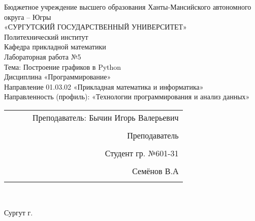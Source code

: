 \documentclass[a4paper]{article}
\begin{document}
\thispagestyle{empty}
\begin{center}

\large{Бюджетное учреждение высшего образования Ханты-Мансийского автономного округа – Югры}\\
\large{«СУРГУТСКИЙ ГОСУДАРСТВЕННЫЙ УНИВЕРСИТЕТ»}\\

\hfill \break
\normalsize{Политехнический институт}\\
 \hfill \break
\normalsize{Кафедра прикладной математики}\\
\hfill\break
\hfill \break
\hfill \break
\hfill \break
\large{Лабораторная работа №5}\\
\normalsize{Тема: Построение графиков в Python}\\
\hfill \break
\hfill \break
\hfill \break
\hfill \break
Дисциплина «Программирование»\\
\hfill \break
\small{Направление 01.03.02 «Прикладная математика и информатика»\\
Направленность (профиль): «Технологии программирования и анализ данных»}\\
\end{center}

\hfill \break
\hfill \break
\hfill \break
\hfill \break
\hfill \break
\hfill \break

\begin{flushright}
\normalsize{ 
\begin{tabular}{ccrr}
 & & & Преподаватель: Бычин Игорь Валерьевич \\\\
 & & & Преподаватель \\\\
 & & & Студент гр. №601-31 \\\\
 & & & Семёнов В.А \\\\
\end{tabular}
}\\
\end{flushright}

\hfill \break
\hfill \break
\begin{center} Сургут \the\year{} г.  \end{center}
\end{document}
